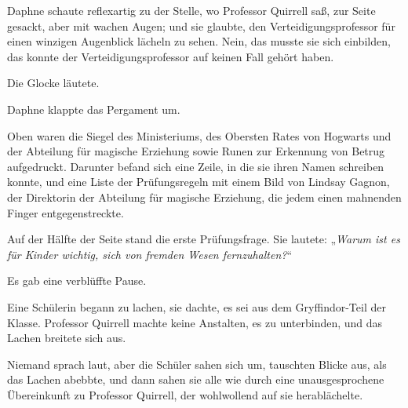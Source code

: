 Daphne schaute reflexartig zu der Stelle, wo Professor Quirrell saß, zur Seite gesackt, aber mit wachen Augen; und sie glaubte, den Verteidigungsprofessor für einen winzigen Augenblick lächeln zu sehen. Nein, das musste sie sich einbilden, das konnte der Verteidigungsprofessor auf keinen Fall gehört haben.

Die Glocke läutete.

Daphne klappte das Pergament um.

Oben waren die Siegel des Ministeriums, des Obersten Rates von Hogwarts und der Abteilung für magische Erziehung sowie Runen zur Erkennung von Betrug aufgedruckt. Darunter befand sich eine Zeile, in die sie ihren Namen schreiben konnte, und eine Liste der Prüfungsregeln mit einem Bild von Lindsay Gagnon, der Direktorin der Abteilung für magische Erziehung, die jedem einen mahnenden Finger entgegenstreckte.

Auf der Hälfte der Seite stand die erste Prüfungsfrage. Sie lautete:
%
„\emph{Warum ist es für Kinder wichtig, sich von fremden Wesen fernzuhalten?}“

Es gab eine verblüffte Pause.

Eine Schülerin begann zu lachen, sie dachte, es sei aus dem Gryffindor-Teil der Klasse. Professor Quirrell machte keine Anstalten, es zu unterbinden, und das Lachen breitete sich aus.

Niemand sprach laut, aber die Schüler sahen sich um, tauschten Blicke aus, als das Lachen abebbte, und dann sahen sie alle wie durch eine unausgesprochene Übereinkunft zu Professor Quirrell, der wohlwollend auf sie herablächelte.

